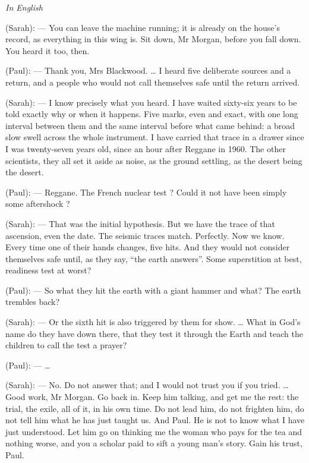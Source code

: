 \begin{room}

\textit{In English}

(Sarah): --- You can leave the machine running; it is already on the house's record, as everything in this wing is. Sit down, Mr Morgan, before you fall down. You heard it too, then.

(Paul): --- Thank you, Mrs Blackwood. \ldots{} I heard five deliberate sources and a return, and a people who would not call themselves safe until the return arrived. 

(Sarah): --- I know precisely what you heard. I have waited sixty-six years to be told exactly why or when it happens. Five marks, even and exact, with one long interval between them and the same interval before what came behind: a broad slow swell across the whole instrument. I have carried that trace in a drawer since I was twenty-seven years old, since an hour after Reggane in 1960. The other scientists, they all set it aside as noise, as the ground settling, as the desert being the desert. 

(Paul): --- Reggane. The French nuclear test ? Could it not have been simply some aftershock ?

(Sarah): --- That was the initial hypothesis. But we have the trace of that ascension, even the date. The seismic traces match. Perfectly. Now we know. Every time one of their hands changes, five hits. And they would not consider themselves safe until, as they say, ``the earth answers''. Some superstition at best, readiness test at worst?

(Paul): --- So what they hit the earth with a giant hammer and what? The earth trembles back?

(Sarah): --- Or the sixth hit is also triggered by them for show. \ldots{} What in God's name do they have down there, that they test it through the Earth and teach the children to call the test a prayer?

(Paul): --- \ldots{}

(Sarah): --- No. Do not answer that; and I would not trust you if you tried. \ldots{} Good work, Mr Morgan. Go back in. Keep him talking, and get me the rest: the trial, the exile, all of it, in his own time. Do not lead him, do not frighten him, do not tell him what he has just taught us. And Paul. He is not to know what I have just understood. Let him go on thinking me the woman who pays for the tea and nothing worse, and you a scholar paid to sift a young man's story. Gain his trust, Paul.

\end{room}
